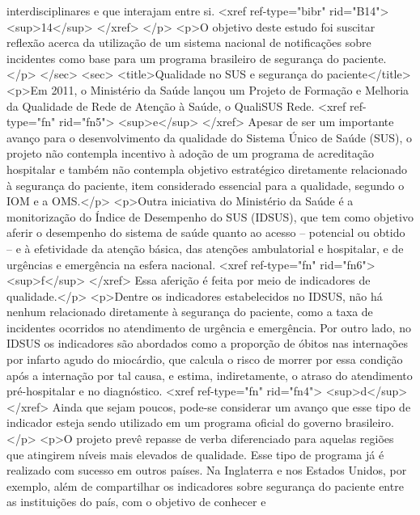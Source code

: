         interdisciplinares e que interajam entre si. <xref ref-type="bibr" rid="B14">
          <sup>14</sup>
        </xref>
      </p>
      <p>O objetivo deste estudo foi suscitar reflexão acerca da utilização de um sistema nacional
        de notificações sobre incidentes como base para um programa brasileiro de segurança do
        paciente.</p>
    </sec>
    <sec>
      <title>Qualidade no SUS e segurança do paciente</title>
      <p>Em 2011, o Ministério da Saúde lançou um Projeto de Formação e Melhoria da Qualidade de
        Rede de Atenção à Saúde, o QualiSUS Rede. <xref ref-type="fn" rid="fn5">
          <sup>e</sup>
        </xref> Apesar de ser um importante avanço para o desenvolvimento da qualidade do Sistema
        Único de Saúde (SUS), o projeto não contempla incentivo à adoção de um programa de
        acreditação hospitalar e também não contempla objetivo estratégico diretamente relacionado à
        segurança do paciente, item considerado essencial para a qualidade, segundo o IOM e a
        OMS.</p>
      <p>Outra iniciativa do Ministério da Saúde é a monitorização do Índice de Desempenho do SUS
        (IDSUS), que tem como objetivo aferir o desempenho do sistema de saúde quanto ao acesso –
        potencial ou obtido – e à efetividade da atenção básica, das atenções ambulatorial e
        hospitalar, e de urgências e emergência na esfera nacional. <xref ref-type="fn" rid="fn6">
          <sup>f</sup>
        </xref> Essa aferição é feita por meio de indicadores de qualidade.</p>
      <p>Dentre os indicadores estabelecidos no IDSUS, não há nenhum relacionado diretamente à
        segurança do paciente, como a taxa de incidentes ocorridos no atendimento de urgência e
        emergência. Por outro lado, no IDSUS os indicadores são abordados como a proporção de óbitos
        nas internações por infarto agudo do miocárdio, que calcula o risco de morrer por essa
        condição após a internação por tal causa, e estima, indiretamente, o atraso do atendimento
        pré-hospitalar e no diagnóstico. <xref ref-type="fn" rid="fn4">
          <sup>d</sup>
        </xref> Ainda que sejam poucos, pode-se considerar um avanço que esse tipo de indicador
        esteja sendo utilizado em um programa oficial do governo brasileiro.</p>
      <p>O projeto prevê repasse de verba diferenciado para aquelas regiões que atingirem níveis
        mais elevados de qualidade. Esse tipo de programa já é realizado com sucesso em outros
        países. Na Inglaterra e nos Estados Unidos, por exemplo, além de compartilhar os indicadores
        sobre segurança do paciente entre as instituições do país, com o objetivo de conhecer e
